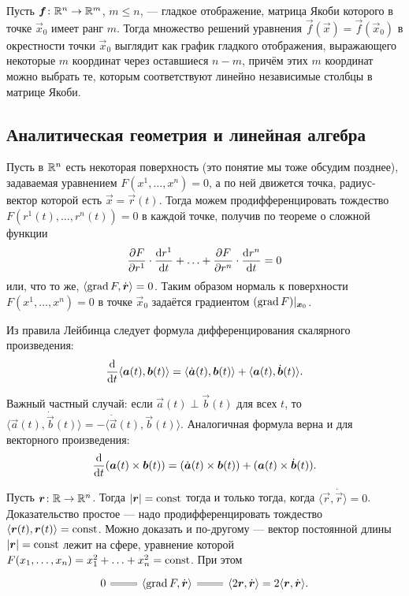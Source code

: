 \begin{theorem}
	Пусть $\boldsymbol{f}\colon \mathbb{R}^n \to \mathbb{R}^m$, $m \leqslant n$, --- гладкое отображение, матрица Якоби которого в точке $\vec{x}_0$ имеет ранг $m$. Тогда множество решений уравнения $\vec{f}(\vec{x}) = \vec{f}(\vec{x}_0)$ в окрестности точки $\vec{x}_0$ выглядит как график гладкого отображения, выражающего некоторые $m$ координат через оставшиеся $n - m$, причём этих $m$ координат можно выбрать те, которым соответствуют линейно независимые столбцы в матрице Якоби.
\end{theorem}

\subsection{Аналитическая геометрия и линейная алгебра}

Пусть в $\mathbb{R}^n$ есть некоторая поверхность (это понятие мы тоже обсудим позднее), задаваемая уравнением $F(x^1, \ldots, x^n) = 0$, а по ней движется точка, радиус-вектор которой есть $\vec{x} = \vec{r}(t)$. Тогда можем продифференцировать тождество $F(r^1(t), \ldots, r^n(t)) = 0$ в каждой точке, получив по теореме о сложной функции
\[
	\frac{\partial F}{\partial r^1} \cdot \frac{\mathop{}\!\mathrm{d} r^1}{\mathop{}\!\mathrm{d} t} + \ldots + \frac{\partial F}{\partial r^n} \cdot \frac{\mathop{}\!\mathrm{d} r^n}{\mathop{}\!\mathrm{d} t} = 0
\]
или, что то же, $\langle \operatorname{grad} F, \dot{\boldsymbol{r}} \rangle = 0$. Таким образом нормаль к поверхности $F(x^1, \ldots, x^n) = 0$ в точке $\vec{x}_0$ задаётся градиентом $(\operatorname{grad} F)|_{\boldsymbol{x}_0}$.

Из правила Лейбинца следует формула дифференцирования скалярного произведения:
\[
	\frac{\mathop{}\!\mathrm{d}}{\mathop{}\!\mathrm{d} t}\langle \boldsymbol{a}(t), \boldsymbol{b}(t) \rangle = \langle \dot{\boldsymbol{a}}(t), \boldsymbol{b}(t) \rangle + \langle \boldsymbol{a}(t), \dot{\boldsymbol{b}}(t) \rangle.
\]

Важный частный случай: если $\vec{a}(t) \perp \vec{b}(t)$ для всех $t$, то $\langle\vec{a}(t), \dot{\vec{b}}(t)\rangle = -\langle\dot{\vec{a}}(t), \vec{b}(t)\rangle$. Аналогичная формула верна и для векторного произведения:
\[
	\frac{\mathop{}\!\mathrm{d}}{\mathop{}\!\mathrm{d} t}(\boldsymbol{a}(t) \times \boldsymbol{b}(t)) = (\dot{\boldsymbol{a}}(t) \times \boldsymbol{b}(t)) + (\boldsymbol{a}(t) \times \dot{\boldsymbol{b}}(t)).
\]

Пусть $\boldsymbol{r}\colon \mathbb{R} \to \mathbb{R}^n$. Тогда $\left\lvert\boldsymbol{r}\right\rvert = \mathrm{const}$ тогда и только тогда, когда $\langle \vec{r}, \dot{\vec{r}} \rangle = 0$. Доказательство простое --- надо продифференцировать тождество $\langle \boldsymbol{r}(t), \boldsymbol{r}(t) \rangle = \mathrm{const}$. Можно доказать и по-другому --- вектор постоянной длины $\left\lvert\boldsymbol{r}\right\rvert = \mathrm{const}$ лежит на сфере, уравнение которой $F(x_1, \ldots, x_n) = x_1^2 + \ldots + x_n^2 = \mathrm{const}$. При этом
\[\begin{tikzcd}
	{0} & {\langle\grad{F}, \dot{\vec{r}}\rangle} & {\langle 2\vec{r}, \dot{\vec{r}}\rangle = 2\langle\vec{r}, \dot{\vec{r}}\rangle}.
	\arrow[equals, from=1-2, to=1-1]
	\arrow[equals, from=1-2, to=1-3]
\end{tikzcd}\]

